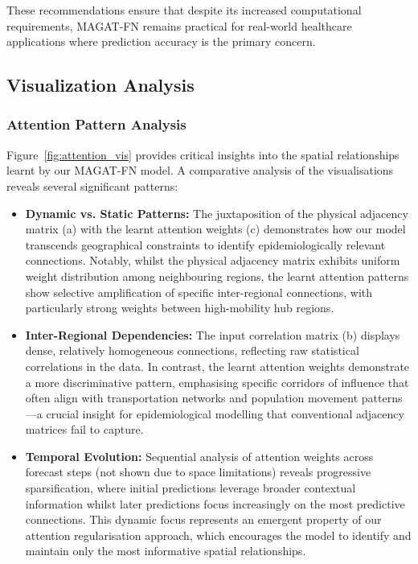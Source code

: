 \documentclass[lettersize, journal]{IEEEtran}
\begin{document}
These recommendations ensure that despite its increased computational requirements, MAGAT-FN remains practical for real-world healthcare applications where prediction accuracy is the primary concern.

\subsection{Visualization Analysis}

\subsubsection{Attention Pattern Analysis}
Figure~\ref{fig:attention_vis} provides critical insights into the spatial relationships learnt by our MAGAT-FN model. A comparative analysis of the visualisations reveals several significant patterns:

\begin{itemize}
    \item \textbf{Dynamic vs. Static Patterns:} The juxtaposition of the physical adjacency matrix (a) with the learnt attention weights (c) demonstrates how our model transcends geographical constraints to identify epidemiologically relevant connections. Notably, whilst the physical adjacency matrix exhibits uniform weight distribution among neighbouring regions, the learnt attention patterns show selective amplification of specific inter-regional connections, with particularly strong weights between high-mobility hub regions.
    
    \item \textbf{Inter-Regional Dependencies:} The input correlation matrix (b) displays dense, relatively homogeneous connections, reflecting raw statistical correlations in the data. In contrast, the learnt attention weights demonstrate a more discriminative pattern, emphasising specific corridors of influence that often align with transportation networks and population movement patterns—a crucial insight for epidemiological modelling that conventional adjacency matrices fail to capture.
    
    \item \textbf{Temporal Evolution:} Sequential analysis of attention weights across forecast steps (not shown due to space limitations) reveals progressive sparsification, where initial predictions leverage broader contextual information whilst later predictions focus increasingly on the most predictive connections. This dynamic focus represents an emergent property of our attention regularisation approach, which encourages the model to identify and maintain only the most informative spatial relationships.
\end{itemize}
\end{document}
